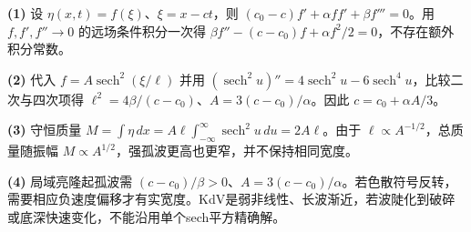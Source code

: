 \par\noindent\textbf{(1)} 设 \(\eta(x,t)=f(\xi)\)、\(\xi=x-ct\)，则 \((c_0-c)f'+\alpha f f'+\beta f'''=0\)。用 \(f,f',f''\to0\) 的远场条件积分一次得 \(\beta f''-(c-c_0)f+\alpha f^2/2=0\)，不存在额外积分常数。
\par\noindent\textbf{(2)} 代入 \(f=A\operatorname{sech}^2(\xi/\ell)\) 并用 \((\operatorname{sech}^2u)''=4\operatorname{sech}^2u-6\operatorname{sech}^4u\)，比较二次与四次项得 \(\ell^2=4\beta/(c-c_0)\)、\(A=3(c-c_0)/\alpha\)。因此 \(c=c_0+\alpha A/3\)。
\par\noindent\textbf{(3)} 守恒质量 \(M=\int\eta\,dx=A\ell\int_{-\infty}^\infty\operatorname{sech}^2u\,du=2A\ell\)。由于 \(\ell\propto A^{-1/2}\)，总质量随振幅 \(M\propto A^{1/2}\)，强孤波更高也更窄，并不保持相同宽度。
\par\noindent\textbf{(4)} 局域亮隆起孤波需 \((c-c_0)/\beta>0\)、\(A=3(c-c_0)/\alpha\)。若色散符号反转，需要相应负速度偏移才有实宽度。KdV是弱非线性、长波渐近，若波陡化到破碎或底深快速变化，不能沿用单个sech平方精确解。
